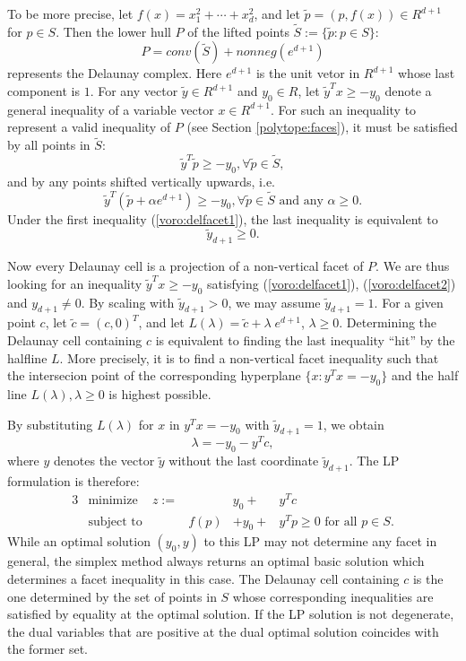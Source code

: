 \documentclass[a4paper,12pt]{article}
\begin{document}
To be more precise, let 
$f(x) = x_1^2 + \cdots + x_d^2$, and let $\tilde{p}= (p, f(x)) \in R^{d+1}$
for $p \in S$.    Then the lower hull $P$ of the lifted points
 $\tilde{S}:=\{\tilde{p}:  p\in S\}$:
\[
P =  conv(\tilde{S}) + nonneg(e^{d+1})
\]
represents the Delaunay complex. 
Here $e^{d+1}$ is the unit vetor in $R^{d+1}$ whose last component is $1$.
For any vector $\tilde{y} \in R^{d+1}$ and $y_0 \in R$, 
let $\tilde{y}^T x \ge -y_0$ denote a general inequality of a variable
vector $x \in R^{d+1}$.  For such an inequality
to represent a valid inequality of $P$ (see Section \ref{polytope:faces}), 
it must be satisfied by all points in $\tilde{S}$:
\begin{equation} \label{voro:delfacet1}
 \tilde{y}^T \tilde{p} \ge -y_0, \forall \tilde{p} \in \tilde{S},
\end{equation}
and by any points shifted vertically upwards, i.e.
\[
 \tilde{y}^T ( \tilde{p} + \alpha e^{d+1})
\ge -y_0, \forall \tilde{p} \in \tilde{S} \text{ and any } \alpha \ge 0.
\]
\noindent
Under the first inequality (\ref{voro:delfacet1}), 
the last inequality is equivalent to 
\begin{equation} \label{voro:delfacet2}
 \tilde{y}_{d+1} \ge 0.
\end{equation}

\noindent
Now every Delaunay cell
is a projection of a non-vertical facet of $P$.  We are thus looking
for an inequality $\tilde{y}^T x \ge -y_0$ satisfying
(\ref{voro:delfacet1}), (\ref{voro:delfacet2}) and $y_{d+1}\neq 0$.
By scaling with $\tilde{y}_{d+1}>0$, we may assume $\tilde{y}_{d+1} = 1$.
For a given point $c$, let $\tilde{c} = (c, 0)^T$, and let
$L(\lambda)= \tilde{c} + \lambda \; e^{d+1}$, $\lambda \ge 0$.
Determining the Delaunay cell containing $c$
is equivalent to finding the last inequality ``hit'' by the halfline
$L$.  More precisely, it is to find a non-vertical facet inequality
such that the intersecion point of the corresponding hyperplane
$\{ x :  y^T x = -y_0\}$ and the half line $L(\lambda), \lambda \ge 0$
is highest possible.  

By substituting $L(\lambda)$ for $x$ in $y^T x = -y_0$ with
$\tilde{y}_{d+1} = 1$, we obtain
\[
 \lambda = -y_0 - y^T c,
\]
where $y$ denotes the vector $\tilde{y}$ without the last coordinate
$\tilde{y}_{d+1}$.  The LP formulation is therefore:
\begin{alignat}{3} \label{eq:dela_celllp}
&\text{minimize}  
  &  z :=  &       &   y_0 + & y^T c \\
&\text{subject to}  
  &        & f(p) & + y_0 +  &y^T p \ge 0 \text{ for all }  p \in S.  \nonumber
\end{alignat}
While an optimal solution $(y_0, y)$ to this LP may not determine
any facet in general, the simplex method always returns an optimal
basic solution which determines a facet inequality in this case.
The Delaunay cell containing $c$ is the one determined by 
the set of points in $S$ whose corresponding inequalities
are satisfied by equality at the optimal solution.  If the LP
solution is not degenerate, the dual variables that are positive
at the dual optimal solution coincides with the former set.
\end{document}
